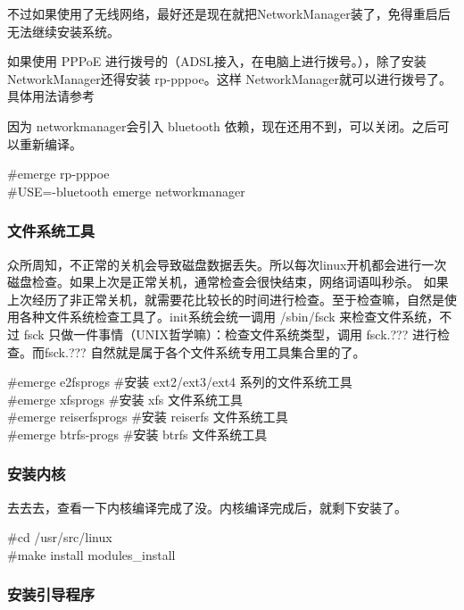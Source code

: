 不过如果使用了无线网络，最好还是现在就把NetworkManager装了，免得重启后无法继续安装系统。

如果使用 PPPoE 进行拨号的（ADSL接入，在电脑上进行拨号。），除了安装NetworkManager还得安装 rp-pppoe。这样 NetworkManager就可以进行拨号了。
具体用法请参考 

因为 networkmanager会引入 bluetooth 依赖，现在还用不到，可以关闭。之后可以重新编译。

\begin{code}
\#emerge rp-pppoe\\
\#USE=-bluetooth emerge networkmanager
\end{code}

\subsubsection{文件系统工具}

众所周知，不正常的关机会导致磁盘数据丢失。所以每次linux开机都会进行一次磁盘检查。如果上次是正常关机，通常检查会很快结束，网络词语叫秒杀。
如果上次经历了非正常关机，就需要花比较长的时间进行检查。至于检查嘛，自然是使用各种文件系统检查工具了。init系统会统一调用 /sbin/fsck 来检查文件系统，不过 fsck 只做一件事情（UNIX哲学嘛）：检查文件系统类型，调用 fsck.??? 进行检查。而fsck.??? 自然就是属于各个文件系统专用工具集合里的了。

\begin{code}
\#emerge e2fsprogs	\#安装 ext2/ext3/ext4 系列的文件系统工具\\
\#emerge xfsprogs	\#安装 xfs 文件系统工具\\
\#emerge reiserfsprogs	\#安装 reiserfs 文件系统工具\\
\#emerge btrfs-progs	\#安装 btrfs 文件系统工具\\
\end{code}

\subsubsection{安装内核}

去去去，查看一下内核编译完成了没。内核编译完成后，就剩下安装了。

\begin{code}
\#cd /usr/src/linux\\
\#make install modules\_install
\end{code}

\subsubsection{安装引导程序}

